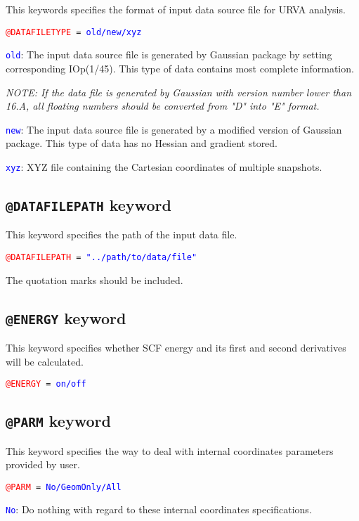 This keywords specifies the format of input data source file for URVA analysis. 

\texttt{\textcolor{red}{@DATAFILETYPE} = \textcolor{blue}{old/new/xyz}}

\textcolor{blue}{\texttt{old}}: The input data source file is generated by Gaussian package by setting corresponding IOp(1/45). This type of data contains most complete information.

\textit{NOTE: If the data file is generated by Gaussian with version number lower than 16.A, all floating numbers should be converted from "D" into "E" format. }

\textcolor{blue}{\texttt{new}}: The input data source file is generated by a modified version of Gaussian package. This type of data has no Hessian and gradient stored. 

\textcolor{blue}{\texttt{xyz}}: XYZ file containing the Cartesian coordinates of multiple snapshots.


\subsection{\texttt{@DATAFILEPATH} keyword }
This keyword specifies the path of the input data file.

\texttt{\textcolor{red}{@DATAFILEPATH} = \textcolor{blue}{"../path/to/data/file"} }

The quotation marks should be included.


\subsection{\texttt{@ENERGY} keyword }
This keyword specifies whether SCF energy and its first and second derivatives will be calculated.


\texttt{\textcolor{red}{@ENERGY} = \textcolor{blue}{on/off}  }










\subsection{\texttt{@PARM} keyword }
This keyword specifies the way to deal with internal coordinates parameters provided by user.

\texttt{\textcolor{red}{@PARM} = \textcolor{blue}{No/GeomOnly/All}  }

\textcolor{blue}{\texttt{No}}: Do nothing with regard to these internal coordinates specifications.

